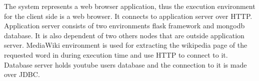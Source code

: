 The system represents a web browser application, thus the execution environment for the client side is a web browser. It connects to application server over HTTP. Application server consists of two environments flask framework and mongodb database. It is also dependent of two others nodes that are outside application server. MediaWiki environment is used for extracting the wikipedia page of the requested word in during execution time and use HTTP to connect to it. Database server holds youtube users database and the connection to it is made over JDBC.









 






